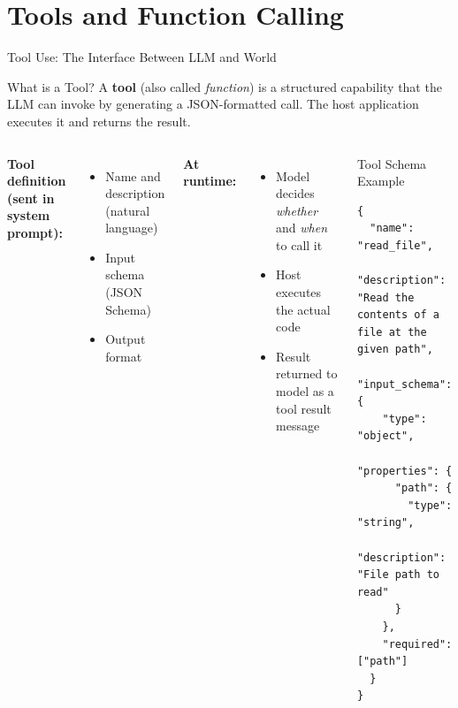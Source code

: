 \documentclass[aspectratio=169,xcolor=dvipsnames]{beamer}
\begin{document}
\section{Tools and Function Calling}

\begin{frame}[fragile]{Tool Use: The Interface Between LLM and World}
    \begin{block}{What is a Tool?}
        A \textbf{tool} (also called \emph{function}) is a structured capability that the LLM can invoke by generating a JSON-formatted call. The host application executes it and returns the result.
    \end{block}

    \begin{columns}
        \textbf{Tool definition (sent in system prompt):}
        \begin{itemize}
            \item Name and description (natural language)
            \item Input schema (JSON Schema)
            \item Output format
        \end{itemize}
        \vspace{0.2cm}
        \textbf{At runtime:}
        \begin{itemize}
            \item Model decides \emph{whether} and \emph{when} to call it
            \item Host executes the actual code
            \item Result returned to model as a tool result message
        \end{itemize}

        \begin{exampleblock}{Tool Schema Example}
                        \begin{lstlisting}[style=JSONStyle]
{
  "name": "read_file",
  "description": "Read the contents of a file at the given path",
  "input_schema": {
    "type": "object",
    "properties": {
      "path": {
        "type": "string",
        "description": "File path to read"
      }
    },
    "required": ["path"]
  }
}
            \end{lstlisting}
        \end{exampleblock}
    \end{columns}
\end{frame}
\end{document}
